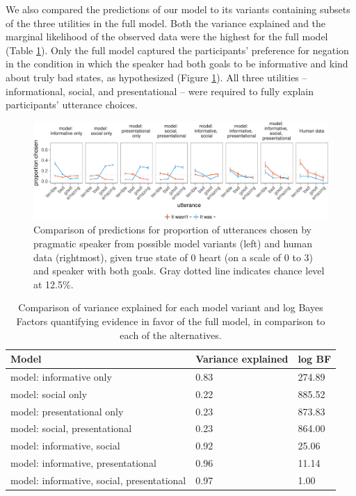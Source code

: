 \documentclass[12pt]{article}
\begin{document}
We also compared the predictions of our model to its variants containing subsets of the three utilities in the full model. Both the variance explained and the marginal likelihood of the observed data were the highest for the full model (Table \ref{tab:comparisonTable}).
Only the full model captured the participants' preference for negation in the condition in which the speaker had both goals to be informative and kind about truly bad states, as hypothesized (Figure \ref{fig:comparison}). All three utilities -- informational, social, and presentational -- were required to fully explain participants' utterance choices.

\begin{figure}
\centering
\includegraphics[width=\textwidth]{polite_manuscript_files/figure-latex/comparison-1.pdf}
\caption{\label{fig:comparison}Comparison of predictions for proportion of
utterances chosen by pragmatic speaker from possible model variants
(left) and human data (rightmost), given true state of 0 heart (on a scale
of 0 to 3) and speaker with both goals. Gray dotted line indicates
chance level at 12.5\%.}
\end{figure}

\begin{table}[tbp]
\begin{center}
\begin{threeparttable}
\caption{\label{tab:comparisonTable}Comparison of variance explained for each model variant and log Bayes Factors quantifying evidence in favor of the full model, in comparison to each of the alternatives.}
\begin{tabular}{lll}
\toprule
Model & \multicolumn{1}{c}{Variance
explained} & \multicolumn{1}{c}{log BF}\\
\midrule
model:
informative only & 0.83 & 274.89\\
model:
social only & 0.22 & 885.52\\
model:
presentational
only & 0.23 & 873.83\\
model:
social,
presentational & 0.23 & 864.00\\
model:
informative,
social & 0.92 & 25.06\\
model:
informative,
presentational & 0.96 & 11.14\\
model:
informative,
social,
presentational & 0.97 & 1.00\\
\bottomrule
\end{tabular}
\end{threeparttable}
\end{center}
\end{table}
\end{document}

